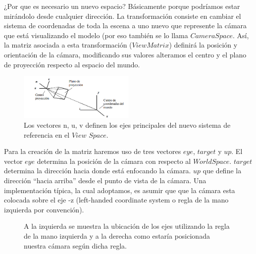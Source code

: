 \documentclass[a4paper]{article}
\newcounter{col}
\begin{document}
\par ¿Por que es necesario un nuevo espacio? Básicamente porque podríamos estar mirándolo desde cualquier dirección. La transformación consiste en cambiar el sistema de coordenadas de toda la escena a uno nuevo que represente la cámara que está visualizando el modelo (por eso también se lo llama $Camera Space$. Así, la matriz asociada a esta transformación ($View Matrix$) definirá la posición y orientación de la cámara, modificando sus valores alteramos el centro y el plano de proyección respecto al espacio del mundo. 
\begin{figure}[h!]
    \centering
    \includegraphics[width=0.50\textwidth]{Imagenes/a.png}
    \caption{Los vectores n, u, v definen los ejes principales del nuevo sistema de referencia en el $View$ $Space$.}
    \label{fig:mesh1}
\end{figure}

Para la creación de la matriz haremos uso de tres vectores $eye$, $target$ y $up$. El vector $eye$ determina la posición de la cámara con respecto al $World Space$. $target$ determina la dirección hacia donde está enfocando la cámara. $up$ que define la dirección ``hacia arriba'' desde el punto de vista de la cámara.  Una implementación típica, la cual adoptamos, es asumir que que la cámara esta colocada sobre el eje -z (left-handed coordinate system o regla de la mano izquierda por convención).
\begin{figure}[h!]
 \centering
  \caption{A la izquierda se muestra la ubicación de los ejes utilizando la regla de la mano izquierda y a la derecha como estaría posicionada nuestra cámara según dicha regla.}
 \label{f:coordenadas}
\end{figure}
\end{document}

